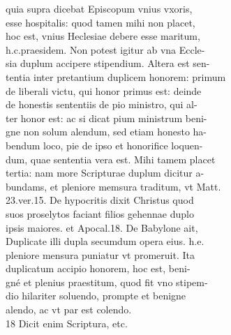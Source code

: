 \documentclass{article}
\begin{document}
\begin{pages}
                quia supra dicebat Episcopum vnius vxoris, \\
                esse hospitalis: quod tamen mihi non placet, \\
                hoc est, vnius Heclesiae debere esse maritum, \\
                h.c.praesidem. Non potest igitur ab vna Eccle- \\
                sia duplum accipere stipendium. Altera est sen- \\
                tentia inter pretantium duplicem honorem: primum \\
                de liberali victu, qui honor primus est: deinde \\
                de honestis sententiis de pio ministro, qui al- \\
                ter honor est: ac si dicat pium ministrum beni- \\
                gne non solum alendum, sed etiam honesto ha- \\
                bendum loco, pie de ipso et honorifice loquen- \\
                dum, quae sententia vera est. Mihi tamem placet \\
                tertia: nam more Scripturae duplum dicitur a- \\
                bundams, et pleniore memsura traditum, vt Matt. \\
                23.ver.15. De hypocritis dixit Christus quod \\
                suos proselytos faciant filios gehennae duplo \\
                ipsis maiores. et Apocal.18. De Babylone ait, \\
                Duplicate illi dupla secumdum opera eius. h.e. \\
                pleniore mensura puniatur vt promeruit. Ita \\
                duplicatum accipio honorem, hoc est, beni- \\
                gné et plenius praestitum, quod fit vno stipem- \\
                dio hilariter soluendo, prompte et benigne \\
                alendo, ac vt par est colendo. \\
                18 Dicit enim Scriptura, etc. \\

\end{pages}
\end{document}
